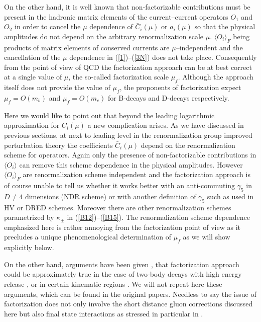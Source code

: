 On the other hand,
it is well known that
non-factorizable contributions must be present in the hadronic matrix
elements of the current--current operators $O_1$ and $O_2$ in order
to cancel the $\mu$ dependence of $\bar C_i(\mu)$ or $a_i(\mu)$ so that
the physical amplitudes do not depend on the arbitrary renormalization
scale $\mu$. 
$\langle O_i\rangle_F$ being products of matrix elements of
conserved currents
are $\mu$--independent and the cancellation of the $\mu$ dependence
in (\ref{1})--(\ref{3N}) does not take place.
Consequently from the point of view of QCD
the factorization approach can be at best correct at a single value
of $\mu$, the so-called factorization scale $\mu_f$. Although the
approach itself does not provide the value of $\mu_f$, the  
proponents
of factorization expect $\mu_f=O(m_b)$ and $\mu_f=O(m_c)$ for
B-decays and D-decays respectively. 

Here we would like to point out that beyond the leading logarithmic
approximation for $\bar C_i(\mu)$ a new complication arises. 
As we have discussed in previous sections,
 at next to leading level in the renormalization
group improved perturbation theory the coefficients $\bar C_i(\mu)$
depend on the renormalization scheme for operators. Again only
the presence of non-factorizable contributions
 in $\langle O_i\rangle$ can
remove this scheme dependence in the physical amplitudes. 
However $\langle O_i\rangle_F$ are renormalization scheme
independent and the factorization approach is of course unable
to tell us whether it works better with an anti-commuting $\gamma_5$
in $D\not=4$ dimensions (NDR scheme) or with another definition 
of $\gamma_5$ such as used in HV or DRED schemes. Moreover there
are other renormalization schemes parametrized by $\kappa_\pm$
in (\ref{B12})--(\ref{B15}).
The renormalization scheme dependence emphasized here is rather
annoying from the factorization point of view as it precludes
a unique phenomenological determination of $\mu_f$ as we will
show explicitly below. 

On the other hand, arguments have been given
\cite{BJORKEN,DUGAN,NEUBERT}, that 
 factorization approach could be
approximately true in the case of two-body decays with high
energy release \cite{BJORKEN}, or in certain kinematic regions
\cite{DUGAN,ISGUR,ITALY}. We will not repeat here these arguments, which
can be found in the original papers.
Needless to say the issue of factorization does not only 
involve the short distance gluon corrections discussed here
but also final state interactions as stressed in particular
in \cite{ITALY}.

